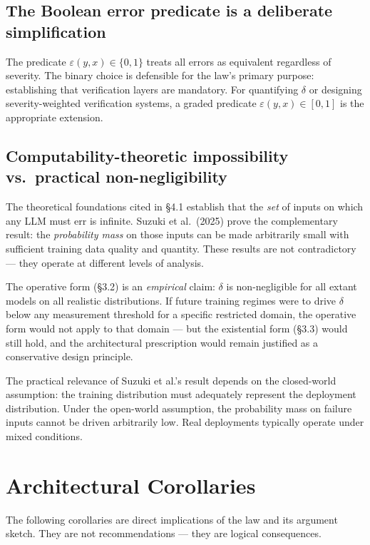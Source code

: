 \documentclass[11pt,a4paper]{article}
\begin{document}
\subsection{The Boolean error predicate is a deliberate simplification}

The predicate $\varepsilon(y, x) \in \{0, 1\}$ treats all errors as equivalent regardless of severity. The binary choice is defensible for the law's primary purpose: establishing that verification layers are mandatory. For quantifying $\delta$ or designing severity-weighted verification systems, a graded predicate $\varepsilon(y, x) \in [0, 1]$ is the appropriate extension.

\subsection{Computability-theoretic impossibility vs.\ practical non-negligibility}

The theoretical foundations cited in \S4.1 establish that the \emph{set} of inputs on which any LLM must err is infinite. Suzuki et al.\ (2025) prove the complementary result: the \emph{probability mass} on those inputs can be made arbitrarily small with sufficient training data quality and quantity. These results are not contradictory --- they operate at different levels of analysis.

The operative form (\S3.2) is an \emph{empirical} claim: $\delta$ is non-negligible for all extant models on all realistic distributions. If future training regimes were to drive $\delta$ below any measurement threshold for a specific restricted domain, the operative form would not apply to that domain --- but the existential form (\S3.3) would still hold, and the architectural prescription would remain justified as a conservative design principle.

The practical relevance of Suzuki et al.'s result depends on the closed-world assumption: the training distribution must adequately represent the deployment distribution. Under the open-world assumption, the probability mass on failure inputs cannot be driven arbitrarily low. Real deployments typically operate under mixed conditions.

\section{Architectural Corollaries}

The following corollaries are direct implications of the law and its argument sketch. They are not recommendations --- they are logical consequences.
\end{document}
